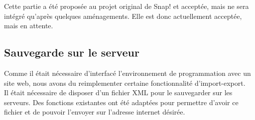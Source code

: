 Cette partie a été proposée au projet original de Snap! et acceptée, mais ne sera intégré qu'après quelques aménagements. Elle est donc actuellement acceptée, mais en attente.

\subsection{Sauvegarde sur le serveur}
Comme il était nécessaire d'interfacé l'environnement de programmation avec un site web, nous avons du reimplementer certaine fonctionnalité d'import-export.\\

Il était nécessaire de disposer d'un fichier XML pour le sauvegarder sur les serveurs. Des fonctions existantes ont été adaptées pour permettre d'avoir ce fichier et de pouvoir l'envoyer sur l'adresse internet désirée.

